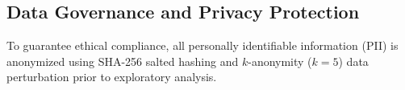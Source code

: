 \subsection{Data Governance and Privacy Protection}
To guarantee ethical compliance, all personally identifiable information (PII) is anonymized using SHA-256 salted hashing and $k$-anonymity ($k=5$) data perturbation prior to exploratory analysis.
